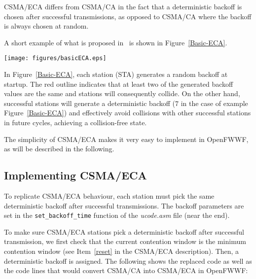 \documentclass[conference]{IEEEtran}
\begin{document}
CSMA/ECA differs from CSMA/CA in the fact that a deterministic backoff is chosen after successful transmissions, as opposed to CSMA/CA where the backoff is always chosen at random.

A short example of what is proposed in~\cite{barcelo2008lba} is shown in Figure~\ref{Basic-ECA}.


\begin{figure*}[t]
\centering
  \texttt{[image: figures/basicECA.eps]}
  \caption{CSMA/ECA example in saturation}
  \label{Basic-ECA}
\end{figure*}

In Figure~\ref{Basic-ECA}, each station (STA) generates a random backoff at startup. The red outline indicates that at least two of the generated backoff values are the same and stations will consequently collide. On the other hand, successful stations will generate a deterministic backoff ($7$ in the case of example Figure~\ref{Basic-ECA}) and effectively avoid collisions with other successful stations in future cycles, achieving a collision-free state.


The simplicity of CSMA/ECA makes it very easy to implement in OpenFWWF, as will be described in the following.

\subsection{Implementing CSMA/ECA}
To replicate CSMA/ECA behaviour, each station must pick the same deterministic backoff after successful transmissions. The backoff parameters are set in the \texttt{set\_backoff\_time} function of the \emph{ucode.asm} file (near the end).

To make sure CSMA/ECA stations pick a deterministic backoff after successful transmission, we first check that the current contention window is the minimum contention window (see Item~\ref{reset} in the CSMA/ECA description). Then, a deterministic backoff is assigned. The following shows the replaced code as well as the code lines that would convert CSMA/CA into CSMA/ECA in OpenFWWF:
\end{document}
